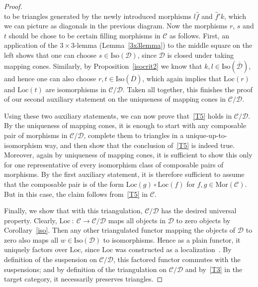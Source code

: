 \documentclass{amsproc}
\theoremstyle{definition}
\begin{document}
\begin{proof}
\[\]
to be triangles generated by the newly introduced morphisms $l\hat{f}$ and $\hat{f}'k$, which we can picture as diagonals in the previous diagram. Now the morphisms $r$, $s$ and $t$ should be chose to be certain filling morphisms in ${\mathcal{C}}$ as follows. First, an application of the $3\!\times\! 3$-lemma (Lemma~\ref{3x3lemma}) to the middle square on the left shows that one can choose $s\in{\mathrm{Iso}}({\mathcal{D}})$, since ${\mathcal{D}}$ is closed under taking mapping cones. Similarly, by Proposition~\ref{isocrit2} we know that $k,l\in{\mathrm{Iso}}(\overline{\mathcal{D}})$, and hence one can also choose $r,t\in{\mathrm{Iso}}(\overline{D})$, which again implies that ${\mathrm{Loc}}(r)$ and ${\mathrm{Loc}}(t)$ are isomorphisms in ${\mathcal{C}}/{\mathcal{D}}$. Taken all together, this finishes the proof of our second auxiliary statement on the uniqueness of mapping cones in ${\mathcal{C}}/{\mathcal{D}}$.

Using these two auxiliary statements, we can now prove that~\ref{T5} holds in ${\mathcal{C}}/{\mathcal{D}}$. By the uniqueness of mapping cones, it is enough to start with any composable pair of morphisms in ${\mathcal{C}}/{\mathcal{D}}$, complete them to triangles in a unique-up-to-isomorphism way, and then show that the conclusion of~\ref{T5} is indeed true. Moreover, again by uniqueness of mapping cones, it is sufficient to show this only for one representative of every isomorphism class of composable pairs of morphisms. By the first auxiliary statement, it is therefore sufficient to assume that the composable pair is of the form ${\mathrm{Loc}}(g)\circ {\mathrm{Loc}}(f)$ for $f,g\in{\mathrm{Mor}}({\mathcal{C}})$. But in this case, the claim follows from~\ref{T5} in ${\mathcal{C}}$.

Finally, we show that with this triangulation, ${\mathcal{C}}/{\mathcal{D}}$ has the desired universal property. Clearly, ${\mathrm{Loc}}\: :\: {\mathcal{C}}{\longrightarrow} {\mathcal{C}}/{\mathcal{D}}$ maps all objects in ${\mathcal{D}}$ to zero objects by Corollary~\ref{iso}. Then any other triangulated functor mapping the objects of ${\mathcal{D}}$ to zero also maps all $w\in{\mathrm{Iso}}({\mathcal{D}})$ to isomorphisms. Hence as a plain functor, it uniquely factors over ${\mathrm{Loc}}$, since ${\mathrm{Loc}}$ was constructed as a localization~\cite[Thm.~3.9]{Fri1}. By definition of the suspension on ${\mathcal{C}}/{\mathcal{D}}$, this factored functor commutes with the suspensions; and by definition of the triangulation on ${\mathcal{C}}/{\mathcal{D}}$ and by~\ref{T3} in the target category, it necessarily preserves triangles.
\end{proof}
\end{document}
